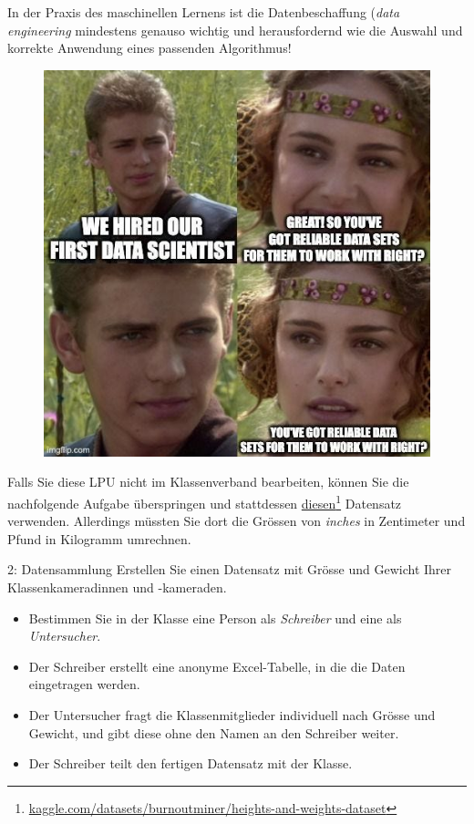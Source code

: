 \begin{lpu}
\begin{hinweis}
In der Praxis des maschinellen Lernens ist die Datenbeschaffung (\textit{data engineering} mindestens genauso wichtig und herausfordernd wie die Auswahl und korrekte Anwendung eines passenden Algorithmus!
\begin{figure}[H]
  \centering
  \includegraphics[scale=0.25]{lpu/data.jpeg}
  \label{fig:data}
\end{figure}

\end{hinweis}

Falls Sie diese LPU nicht im Klassenverband bearbeiten, können Sie die nachfolgende Aufgabe überspringen und stattdessen \href{https://www.kaggle.com/datasets/burnoutminer/heights-and-weights-dataset}{diesen}\footnote{\href{https://www.kaggle.com/datasets/burnoutminer/heights-and-weights-dataset}{\url{kaggle.com/datasets/burnoutminer/heights-and-weights-dataset}}} Datensatz verwenden. Allerdings müssten Sie dort die Grössen von \textit{inches} in Zentimeter und Pfund in Kilogramm umrechnen.

\begin{aufgabe}{2: Datensammlung}
Erstellen Sie einen Datensatz mit Grösse und Gewicht Ihrer Klassenkameradinnen und -kameraden.

\begin{itemize}
  \item Bestimmen Sie in der Klasse eine Person als \emph{Schreiber} und eine als \emph{Untersucher}.
  \item Der Schreiber erstellt eine anonyme Excel-Tabelle, in die die Daten eingetragen werden.
  \item Der Untersucher fragt die Klassenmitglieder individuell nach Grösse und Gewicht, und gibt diese ohne den Namen an den Schreiber weiter.
  \item Der Schreiber teilt den fertigen Datensatz mit der Klasse.
\end{itemize}
\end{aufgabe}


\end{lpu}
